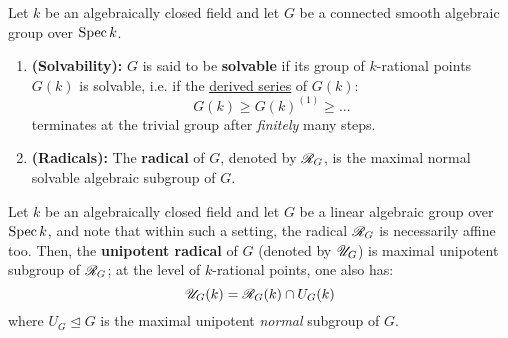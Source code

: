             \begin{definition}[Radicals] \label{def: radicals_of_algebraic_groups}
                Let $k$ be an algebraically closed field and let $G$ be a connected smooth algebraic group over $\operatorname{Spec} k$. 
                    \begin{enumerate}
                        \item \textbf{(Solvability):} $G$ is said to be \textbf{solvable} if its group of $k$-rational points $G(k)$ is solvable, i.e. if the \href{https://ncatlab.org/nlab/show/derived+series}{\underline{derived series}} of $G(k)$:
                            $$G(k) \geq G(k)^{(1)} \geq ... $$
                        terminates at the trivial group after \textit{finitely} many steps. 
                        \item \textbf{(Radicals):} The \textbf{radical} of $G$, denoted by $\mathscr{R}_G$, is the maximal normal solvable algebraic subgroup of $G$. 
                    \end{enumerate}
            \end{definition}
            \begin{remark} \label{remark: unipotent_radicals}
                Let $k$ be an algebraically closed field and let $G$ be a linear algebraic group over $\operatorname{Spec} k$, and note that within such a setting, the radical $\mathscr{R}_G$ is necessarily affine too. Then, the \textbf{unipotent radical} of $G$ (denoted by $\mathscr{U}_G$) is maximal unipotent subgroup of $\mathscr{R}_G$; at the level of $k$-rational points, one also has:
                    $$\mathscr{U}_G(k) = \mathscr{R}_G(k) \cap U_G(k)$$
                where $U_G \trianglelefteq G$ is the maximal unipotent \textit{normal} subgroup of $G$.
            \end{remark}
            
